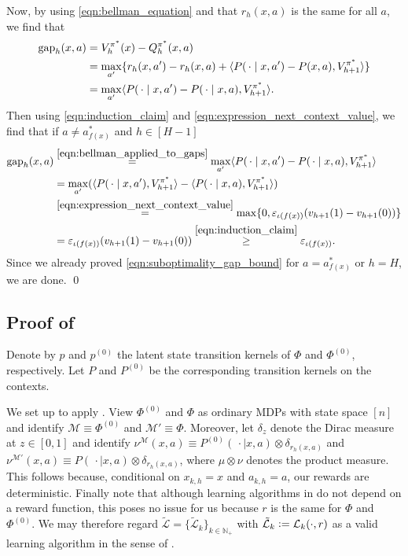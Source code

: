 \documentclass[11pt]{article}
\newcommand{\eqdef}{\vcentcolon=}
\newcommand{\mcL}{\mathcal{L}}
\newcommand{\mcM}{\mathcal{M}}
\newcommand{\mbbN}{\mathbb{N}}
\newcommand{\gap}{\textnormal{gap}}
\theoremstyle{definition}
\theoremstyle{definition}
\begin{document}
Now, by using \eqref{eqn:bellman_equation} and that $r_h(x,a)$ is the same for all $a$, we find that
\begin{equation}
	\label{eqn:bellman_applied_to_gaps}
	\begin{split}
		\gap_h(x,a)
		 &
		=
		V^{\pi^*}_{h}(x)-Q^{\pi^*}_h(x,a)
		\\
		 &
		=
		\max_{a'}
		\{
		r_h(x,a')-r_h(x,a)
		+
		\langle P(\,\cdot\mid  x,a')-P(x,a),V^{\pi^*}_{h+1}\rangle
		\}
		\\
		 &
		=
		\max_{a'}
		\langle P(\,\cdot\mid  x,a')-P(\,\cdot\mid  x,a),V^{\pi^*}_{h+1}\rangle
		.
	\end{split}
\end{equation}
Then using \eqref{eqn:induction_claim} and \eqref{eqn:expression_next_context_value}, we find that if $a\neq a_{f(x)}^*$ and $h\in [H-1]$
\begin{align}
	\gap_h(x,a)
	 &
	\overset{\eqref{eqn:bellman_applied_to_gaps}}{=}
	\max_{a'}
	\langle P(\,\cdot\mid x,a')-P(\,\cdot\mid x,a),V^{\pi^*}_{h+1}\rangle
	\nonumber
	\\
	 &
	=
	\max_{a'}
	(\langle P(\,\cdot\mid x,a'), V^{\pi^*}_{h+1}\rangle - \langle P(\,\cdot\mid x,a),V^{\pi^*}_{h+1}\rangle)
	\nonumber
	\\
	 &
	\overset{\eqref{eqn:expression_next_context_value}}{=}
	\max
	\{ 0, \varepsilon_{\iota(f(x))}(v_{h+1}(1)-v_{h+1}(0))\}
	\nonumber
	\\
	 &
	=
	\varepsilon_{\iota(f(x))}(v_{h+1}(1)-v_{h+1}(0))
	\overset{\eqref{eqn:induction_claim}}{\geq}
	\varepsilon_{\iota(f(x))}
	.
\end{align}
Since we already proved \eqref{eqn:suboptimality_gap_bound} for $a=a_{f(x)}^*$ or $h=H$, we are done.
\qed

\subsection{Proof of \texorpdfstring{}{change of measure argument}}
\label{sec:proof_of_change_of_measure_argument}

Denote by $p$ and $p^{(0)}$ the latent state transition kernels of $\Phi$ and $\Phi^{(0)}$, respectively.
Let $P$ and $P^{(0)}$ be the corresponding transition kernels on the contexts.

We set up to apply \cite[Lemma H.1]{NEURIPS2019_10a5ab2d}.
View $\Phi^{(0)}$ and $\Phi$ as ordinary \glspl{MDP} with state space $[n]$ and identify $\mcM \equiv \Phi^{(0)}$ and $\mcM' \equiv \Phi$.
Moreover, let $\delta_z$ denote the Dirac measure at $z\in[0,1]$ and identify $\nu^{\mcM}(x,a)\equiv P^{(0)}(\,\cdot\mid x,a)\otimes \delta_{r_h(x,a)}$ and $\nu^{\mcM'}(x,a)\equiv P(\,\cdot\mid x,a)\otimes \delta_{r_h(x,a)}$, where $\mu\otimes\nu$ denotes the product measure.
This follows because, conditional on $x_{k,h}=x$ and $a_{k,h}=a$, our rewards are deterministic.
Finally note that although learning algorithms in \cite{NEURIPS2019_10a5ab2d} do not depend on a reward function, this poses no issue for us because $r$ is the same for $\Phi$ and $\Phi^{(0)}$.
We may therefore regard $\tilde{\mcL}=\{\tilde{\mcL}_k\}_{k\in\mbbN_+}$ with $\tilde{\mcL}_k\eqdef \mcL_k(\cdot,r)$ as a valid learning algorithm in the sense of \cite{NEURIPS2019_10a5ab2d}.
\end{document}
